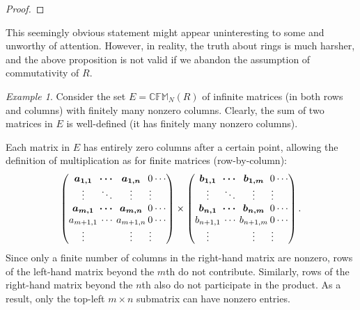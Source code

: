 \documentclass{article}
\newif\ifusemulticols
\theoremstyle{definition}
\theoremstyle{remark}
\newtheorem{example}{Example}[section]
\theoremstyle{plain}
\theoremstyle{plain}
\newenvironment{mymulticols}
    { \ifusemulticols \begin{multicols}{2} \fi }
    { \ifusemulticols \end{multicols} \fi }
\begin{document}
\begin{mymulticols}
\begin{proof}
\end{proof}

This seemingly obvious statement might appear uninteresting to some and unworthy of attention.
However, in reality, the truth about rings is much harsher, and the above proposition is not valid
if we abandon the assumption of commutativity of $R$.

\begin{example}
    \label{example:rank_anomaly}
    Consider the set $E = \mathbb{CFM}_N(R)$ of infinite matrices (in both rows and columns) with
    finitely many nonzero columns. Clearly, the sum of two matrices in $E$ is well-defined (it has
    finitely many nonzero columns).

    Each matrix in $E$ has entirely zero columns after a certain point, allowing the definition of
    multiplication as for finite matrices (row-by-column):
    \begin{equation*}
        \arraycolsep=1pt
        \begin{pmatrix}
            \boldsymbol{a_{1,1}} & \boldsymbol{\cdots} & \boldsymbol{a_{1,n}} & 0 & \cdots\\
            \boldsymbol{\vdots} & \boldsymbol{\ddots} & \boldsymbol{\vdots} & \vdots\\
            \boldsymbol{a_{m,1}} & \boldsymbol{\cdots} & \boldsymbol{a_{m,n}} & 0 & \cdots\\
            a_{m+1,1} & \cdots & a_{m+1,n} & 0 & \cdots\\
            \vdots & & \vdots & \vdots
        \end{pmatrix}
        \times
        \begin{pmatrix}
            \boldsymbol{b_{1,1}} & \boldsymbol{\cdots} & \boldsymbol{b_{1,m}} & 0 & \cdots\\
            \boldsymbol{\vdots} & \boldsymbol{\ddots} & \boldsymbol{\vdots} & \vdots\\
            \boldsymbol{b_{n,1}} & \boldsymbol{\cdots} & \boldsymbol{b_{n,m}} & 0 & \cdots\\
            b_{n+1,1} & \cdots & b_{n+1,m} & 0 & \cdots\\
            \vdots & & \vdots & \vdots
        \end{pmatrix}.
    \end{equation*}
    Since only a finite number of columns in the right-hand matrix are nonzero, rows of the
    left-hand matrix beyond the $m$th do not contribute. Similarly, rows of the right-hand matrix
    beyond the $n$th also do not participate in the product. As a result, only the top-left $m
    \times n$ submatrix can have nonzero entries.


\end{example}
\end{mymulticols}
\end{document}
